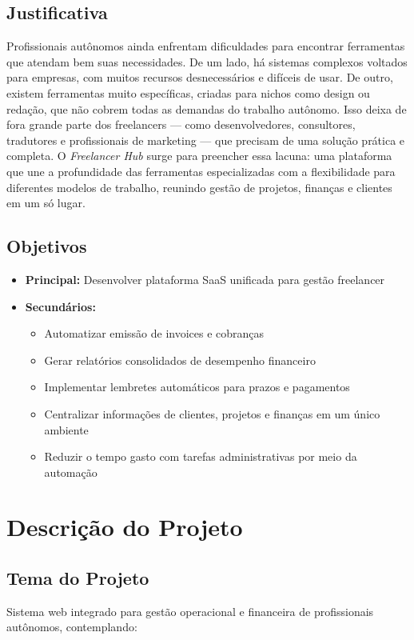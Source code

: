 \documentclass[a4paper,12pt]{article}
\begin{document}
\subsection{Justificativa}
Profissionais autônomos ainda enfrentam dificuldades para encontrar ferramentas que atendam bem suas necessidades. De um lado, há sistemas complexos voltados para empresas, com muitos recursos desnecessários e difíceis de usar. De outro, existem ferramentas muito específicas, criadas para nichos como design ou redação, que não cobrem todas as demandas do trabalho autônomo. Isso deixa de fora grande parte dos freelancers — como desenvolvedores, consultores, tradutores e profissionais de marketing — que precisam de uma solução prática e completa. O \textit{Freelancer Hub} surge para preencher essa lacuna: uma plataforma que une a profundidade das ferramentas especializadas com a flexibilidade para diferentes modelos de trabalho, reunindo gestão de projetos, finanças e clientes em um só lugar.

\subsection{Objetivos}
\begin{itemize}[nosep]
  \item \textbf{Principal:} Desenvolver plataforma SaaS unificada para gestão freelancer
  \item \textbf{Secundários:}
    \begin{itemize}[nosep]
      \item Automatizar emissão de invoices e cobranças
      \item Gerar relatórios consolidados de desempenho financeiro
      \item Implementar lembretes automáticos para prazos e pagamentos
      \item Centralizar informações de clientes, projetos e finanças em um único ambiente
      \item Reduzir o tempo gasto com tarefas administrativas por meio da automação
    \end{itemize}
\end{itemize}

\section{Descrição do Projeto}

\subsection{Tema do Projeto}
Sistema web integrado para gestão operacional e financeira de profissionais autônomos, contemplando:
\end{document}
